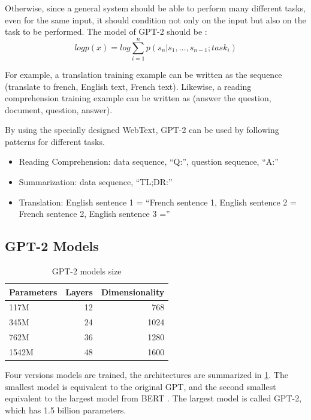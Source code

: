 \documentclass[]{krantz}
\begin{document}
Otherwise, since a general system should be able to perform many different tasks, even for the same input, it should condition not only on the input but also on the task to be performed.
The model of GPT-2 should be :
\[log p(x)=log\sum^{n}_{i=1}p(s_n|s_1,...,s_{n-1};task_i)\]

For example, a translation training example can be written as the sequence (translate to french, English text, French text). Likewise, a reading comprehension training example can be written as (answer the question, document, question, answer).

By using the specially designed WebText, GPT-2 can be used by following patterns for different tasks.

\begin{itemize}
\item
  Reading Comprehension: data sequence, ``Q:'', question sequence, ``A:''
\item
  Summarization: data sequence, ``TL;DR:''
\item
  Translation: English sentence 1 = ``French sentence 1, English sentence 2 = French sentence 2, English sentence 3 =''
\end{itemize}

\hypertarget{gpt-2-models}{%
\subsection{GPT-2 Models}\label{gpt-2-models}}

\begin{table}

\caption{\label{tab:ch02-03-table01}GPT-2 models size}
\centering
\begin{tabular}[t]{l|r|r}
\hline
Parameters & Layers & Dimensionality\\
\hline
117M & 12 & 768\\
\hline
345M & 24 & 1024\\
\hline
762M & 36 & 1280\\
\hline
1542M & 48 & 1600\\
\hline
\end{tabular}
\end{table}

Four versions models are trained, the architectures are summarized in \ref{tab:ch02-03-table01}. The smallest model is equivalent to the original GPT, and the second smallest equivalent to the largest model from BERT \citet{bert}. The largest model is called GPT-2, which has 1.5 billion parameters.
\end{document}
